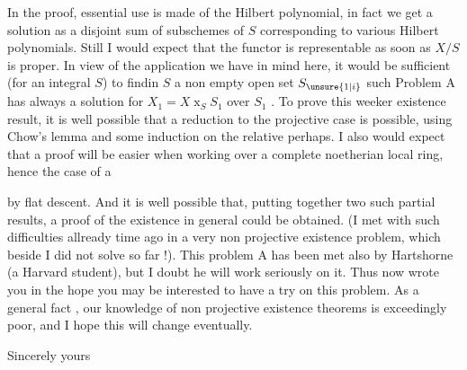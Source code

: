In the proof, essential use is made of the Hilbert polynomial, in fact we get a solution as a disjoint sum of subschemes of $S$ corresponding to various Hilbert polynomials. Still I would expect that the  functor is representable as soon as $X/S$ is proper. In view of the application we have in mind here, it would be sufficient (for an integral $S$) to findin $S$ a non empty  open set $S_{\unsure{1|i}}$ such Problem A has always a solution for $X_1=X\mathbin{x}_S S_1$ over $S_1$ . To prove this weeker existence result, it is well possible that a reduction to the projective case is possible, using Chow's lemma and some induction on the relative  perhaps. I also would expect that a proof will be easier when working over a complete noetherian local ring, hence the case of a
\begin{minipage}[c]{4.7cm}
\end{minipage}
by flat descent. And it is well possible that, putting together two such partial results, a proof of the existence in general could be obtained. (I met with such difficulties allready time ago in a very  non projective existence problem, which beside I did not solve so far !). This problem A has been met also by Hartshorne (a Harvard student), but I doubt he will work seriously on it. Thus  now wrote you in the hope you may be interested to have a try on this problem. As a general fact , our knowledge of non projective existence theorems is exceedingly poor, and I hope this will change eventually.

\noindent\hspace*{1cm}Sincerely yours\hfill{}\par

